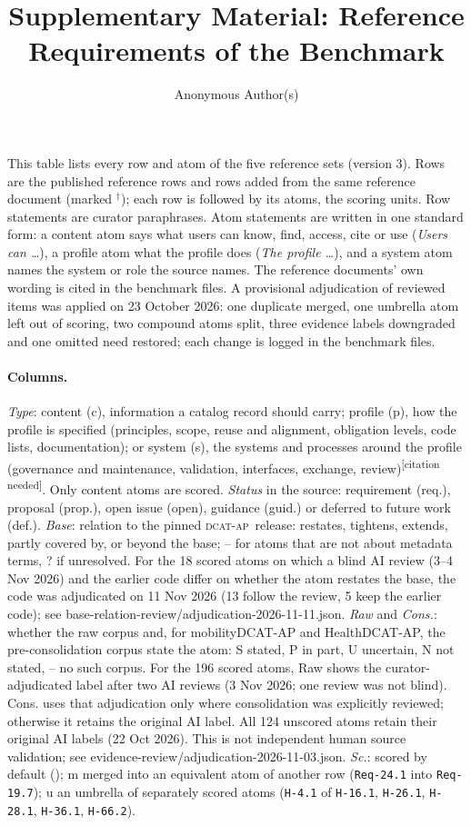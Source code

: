 \documentclass{llncs}
\title{Supplementary Material: Reference Requirements of the Benchmark}
\author{Anonymous Author(s)}
\institute{Anonymous Institution}
\newcommand{\dcatap}{\textsc{dcat-ap}}
\newcommand{\req}[1]{\texttt{#1}}
\newcommand{\citeneeded}{\textsuperscript{[citation needed]}}
\begin{document}
\maketitle

This table lists every row and atom of the five reference sets (version 3). Rows are the published reference rows and rows added from the same reference document (marked $^{\dagger}$); each row is followed by its atoms, the scoring units. Row statements are curator paraphrases. Atom statements are written in one standard form: a content atom says what users can know, find, access, cite or use (\emph{Users can \dots}), a profile atom what the profile does (\emph{The profile \dots}), and a system atom names the system or role the source names. The reference documents' own wording is cited in the benchmark files. A provisional adjudication of reviewed items was applied on 23 October 2026: one duplicate merged, one umbrella atom left out of scoring, two compound atoms split, three evidence labels downgraded and one omitted need restored; each change is logged in the benchmark files.

\paragraph{Columns.} \emph{Type}: content (c), information a catalog record should carry; profile (p), how the profile is specified (principles, scope, reuse and alignment, obligation levels, code lists, documentation); or system (s), the systems and processes around the profile (governance and maintenance, validation, interfaces, exchange, review)\citeneeded. Only content atoms are scored. \emph{Status} in the source: requirement (req.), proposal (prop.), open issue (open), guidance (guid.) or deferred to future work (def.). \emph{Base}: relation to the pinned \dcatap\ release: restates, tightens, extends, partly covered by, or beyond the base; -- for atoms that are not about metadata terms, ? if unresolved. For the 18 scored atoms on which a blind AI review (3--4 Nov 2026) and the earlier code differ on whether the atom restates the base, the code was adjudicated on 11 Nov 2026 (13 follow the review, 5 keep the earlier code); see base-relation-review/adjudication-2026-11-11.json. \emph{Raw} and \emph{Cons.}: whether the raw corpus and, for mobilityDCAT-AP and HealthDCAT-AP, the pre-consolidation corpus state the atom: S stated, P in part, U uncertain, N not stated, -- no such corpus. For the 196 scored atoms, Raw shows the curator-adjudicated label after two AI reviews (3 Nov 2026; one review was not blind). Cons. uses that adjudication only where consolidation was explicitly reviewed; otherwise it retains the original AI label. All 124 unscored atoms retain their original AI labels (22 Oct 2026). This is not independent human source validation; see evidence-review/adjudication-2026-11-03.json. \emph{Sc.}: scored by default (\checkmark); m merged into an equivalent atom of another row (\req{Req-24.1} into \req{Req-19.7}); u an umbrella of separately scored atoms (\req{H-4.1} of \req{H-16.1}, \req{H-26.1}, \req{H-28.1}, \req{H-36.1}, \req{H-66.2}).
\end{document}
